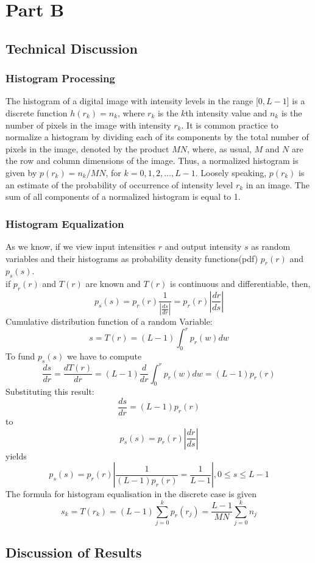 \section{Part B}
\subsection{Technical Discussion}
\subsubsection{Histogram Processing}
The histogram of a digital image with intensity levels in the range [$0, L - 1$] is a discrete function $h(r_k) = n_k$, where $r_k$ is the $k$th intensity value and $n_k$ is the number of pixels in the image with intensity $r_k$. It is common practice to normalize a histogram by dividing each of its components by the total number of pixels in the image, denoted by the product $MN$, where, as usual, $M$ and $N$ are the row and column dimensions of the image. Thus, a normalized histogram is given by $p(r_k) = n_k/MN$, for $k = 0, 1, 2, ..., L-1$. Loosely speaking, $p(r_k)$ is an estimate of the probability of occurrence of intensity level $r_k$ in an image. The sum of all components of a normalized histogram is equal to 1.
\subsubsection{Histogram Equalization}
As we know, if we view input intensities $r$ and output intensity $s$ as random variables and their histograms as probability density functions(pdf) $p_r(r)$ and $p_s(s)$.\\
if $p_r(r)$ and $T(r)$ are known and $T(r)$ is continuous and differentiable, then,
$$ p_s(s) = p_r(r)\frac{1}{\left| \frac{ds}{dr} \right|} = p_r(r)\left| \frac{dr}{ds} \right| $$ 
Cumulative distribution function of a random Variable:
$$s = T(r) = (L - 1)\int_0^r p_r(w)dw$$
To fund $p_s(s)$ we have to compute
$$ \frac{ds}{dr} = \frac{dT(r)}{dr} = (L - 1)\frac{d}{dr}\int_0^r p_r(w)dw = (L - 1)p_r(r) $$
Substituting this result:
$$ \frac{ds}{dr} = (L - 1)p_r(r) $$
to 
$$ p_s(s) = p_r(r)\left| \frac{dr}{ds} \right| $$
yields
$$p_s(s) = p_r(r)\left| \frac{1}{(L - 1)p_r(r)} = \frac{1}{L - 1} \right|, 0 \leq s \leq L - 1 $$
The formula for histogram equalisation in the discrete case is given
$$ s_k = T(r_k) = (L - 1)\sum_{j = 0}^k p_r(r_j) = \frac{L - 1}{MN}\sum_{j = 0}^{k} n_j $$
\subsection{Discussion of Results}

